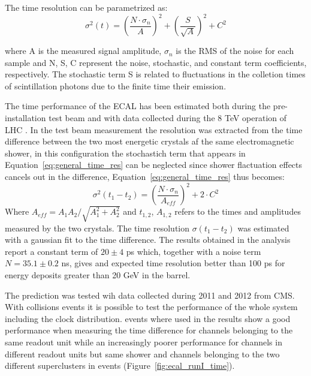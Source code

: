 The time resolution can be parametrized as:
\begin{equation}
  \sigma^2(t) = \left( \frac{N\cdot\sigma_n}{A} \right)^2 + \left( \frac{S}{\sqrt{A}} \right)^2 + C^2  
\end{equation}
\label{eq:general_time_res}

where A is the measured signal amplitude, $\sigma_n$ is the RMS of the noise for each sample and
N, S, C represent the noise, stochastic, and constant term coefficients, respectively.
The stochastic term S is related to fluctuations in the colletion times of scintillation photons due to
the finite time their emission.


The time performance of the ECAL has been estimated both during the pre-installation test beam \cite{ecal_time_reco}
and with data collected during the 8 TeV operation of LHC \cite{delRe_time_ecal}.
In the test beam measurement the resolution was extracted from the time difference between the two most energetic crystals
af the same electromagnetic shower, in this configuration the stochastich term that appears in Equation~\ref{eq:general_time_res}
can be neglected since shower flactuation effects cancels out in the difference, Equation~\ref{eq:general_time_res} thus becomes:
\begin{equation}
  \sigma^2(t_1 - t_2) = \left( \frac{N\cdot\sigma_n}{A_{eff}} \right)^2 + 2 \cdot C^2
\end{equation}
\label{eq:ecal_time_res}
Where $A_{eff} = A_1A_2/\sqrt{A_1^2+A_2^2}$ and $t_{1,2}$, $A_{1,2}$ refers to the times and amplitudes measured by the two crystals. 
The time resolution $\sigma(t_1-t_2)$ was estimated with a gaussian fit to the time difference.
The results obtained in the analysis report a constant term of $20 \pm 4$ ps which, together with a noise term $N = 35.1\pm 0.2$ ns,
gives and expected time resolution better than 100 ps for energy deposits greater than 20 GeV in the barrel.

The prediction was tested wih data collected during 2011 and 2012 from CMS. With collisions events it is possible to
test the performance of the whole system including the clock distribution. \Zee events where used in \cite{delRe_time_ecal}
the results show a good performance when measuring the time difference for channels belonging to the same readout unit while
an increasingly poorer performance for channels in different readout units but same shower and channels belonging to
the two different superclusters in \Zee events (Figure~\ref{fig:ecal_runI_time}).


